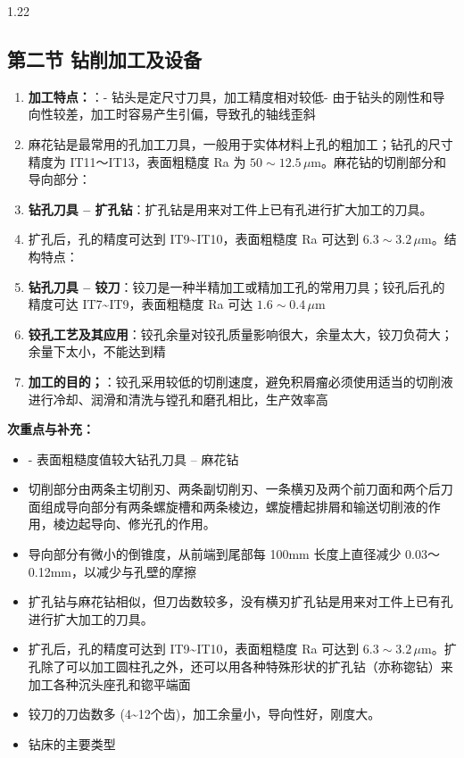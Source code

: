 \documentclass[12pt,a4paper]{article}
\begin{document}
\begin{spacing}{1.22}
\subsection{第二节 钻削加工及设备}
\begin{tcolorbox}[colback=yellow!6,colframe=red!55!black,title=重点,left=1mm,right=1mm]
\begin{enumerate}[leftmargin=2.2em,label=\arabic*.]
  \item \textbf{加工特点：}：- 钻头是定尺寸刀具，加工精度相对较低- 由于钻头的刚性和导向性较差，加工时容易产生引偏，导致孔的轴线歪斜
  \item 麻花钻是最常用的孔加工刀具，一般用于实体材料上孔的粗加工；钻孔的尺寸精度为 IT11～IT13，表面粗糙度 Ra 为 $50\sim12.5\,\mu\text{m}$。麻花钻的切削部分和导向部分：
  \item \textbf{钻孔刀具 – 扩孔钻}：扩孔钻是用来对工件上已有孔进行扩大加工的刀具。
  \item 扩孔后，孔的精度可达到 IT9\textasciitilde{}IT10，表面粗糙度 Ra 可达到 $6.3\sim3.2\,\mu\text{m}$。结构特点：
  \item \textbf{钻孔刀具 – 铰刀}：铰刀是一种半精加工或精加工孔的常用刀具；铰孔后孔的精度可达 IT7\textasciitilde{}IT9，表面粗糙度 Ra 可达 $1.6\sim0.4\,\mu\text{m}$
  \item \textbf{铰孔工艺及其应用}：铰孔余量对铰孔质量影响很大，余量太大，铰刀负荷大；余量下太小，不能达到精
  \item \textbf{加工的目的；}：铰孔采用较低的切削速度，避免积屑瘤必须使用适当的切削液进行冷却、润滑和清洗与镗孔和磨孔相比，生产效率高
\end{enumerate}
\end{tcolorbox}
\noindent\textbf{次重点与补充：}
\begin{itemize}[leftmargin=2.2em,label=--]
  \item - 表面粗糙度值较大钻孔刀具 – 麻花钻
  \item 切削部分由两条主切削刃、两条副切削刃、一条横刃及两个前刀面和两个后刀面组成导向部分有两条螺旋槽和两条棱边，螺旋槽起排屑和输送切削液的作用，棱边起导向、修光孔的作用。
  \item 导向部分有微小的倒锥度，从前端到尾部每 100mm 长度上直径减少 0.03～0.12mm，以减少与孔壁的摩擦
  \item 扩孔钻与麻花钻相似，但刀齿数较多，没有横刃扩孔钻是用来对工件上已有孔进行扩大加工的刀具。
  \item 扩孔后，孔的精度可达到 IT9\textasciitilde{}IT10，表面粗糙度 Ra 可达到 $6.3\sim3.2\,\mu\text{m}$。扩孔除了可以加工圆柱孔之外，还可以用各种特殊形状的扩孔钻（亦称锪钻）来加工各种沉头座孔和锪平端面
  \item 铰刀的刀齿数多 (4\textasciitilde{}12个齿)，加工余量小，导向性好，刚度大。
  \item 钻床的主要类型
\end{itemize}


\end{spacing}
\end{document}
